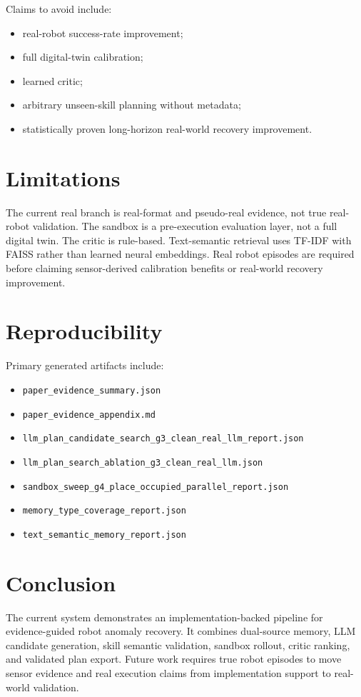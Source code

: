 \documentclass[conference]{IEEEtran}
\begin{document}
Claims to avoid include:
\begin{itemize}
    \item real-robot success-rate improvement;
    \item full digital-twin calibration;
    \item learned critic;
    \item arbitrary unseen-skill planning without metadata;
    \item statistically proven long-horizon real-world recovery improvement.
\end{itemize}

\section{Limitations}
The current real branch is real-format and pseudo-real evidence, not true real-robot validation. The sandbox is a pre-execution evaluation layer, not a full digital twin. The critic is rule-based. Text-semantic retrieval uses TF-IDF with FAISS rather than learned neural embeddings. Real robot episodes are required before claiming sensor-derived calibration benefits or real-world recovery improvement.

\section{Reproducibility}
Primary generated artifacts include:
\begin{itemize}
    \item \texttt{paper\_evidence\_summary.json}
    \item \texttt{paper\_evidence\_appendix.md}
    \item \texttt{llm\_plan\_candidate\_search\_g3\_clean\_real\_llm\_report.json}
    \item \texttt{llm\_plan\_search\_ablation\_g3\_clean\_real\_llm.json}
    \item \texttt{sandbox\_sweep\_g4\_place\_occupied\_parallel\_report.json}
    \item \texttt{memory\_type\_coverage\_report.json}
    \item \texttt{text\_semantic\_memory\_report.json}
\end{itemize}

\section{Conclusion}
The current system demonstrates an implementation-backed pipeline for evidence-guided robot anomaly recovery. It combines dual-source memory, LLM candidate generation, skill semantic validation, sandbox rollout, critic ranking, and validated plan export. Future work requires true robot episodes to move sensor evidence and real execution claims from implementation support to real-world validation.



\end{document}
